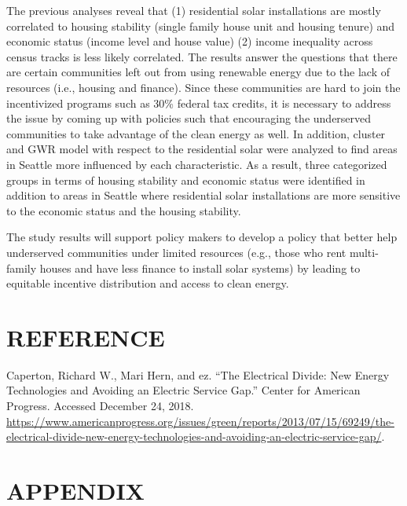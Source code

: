 \documentclass[11pt,]{article}
\begin{document}
The previous analyses reveal that (1) residential solar installations
are mostly correlated to housing stability (single family house unit and
housing tenure) and economic status (income level and house value) (2)
income inequality across census tracks is less likely correlated. The
results answer the questions that there are certain communities left out
from using renewable energy due to the lack of resources (i.e., housing
and finance). Since these communities are hard to join the incentivized
programs such as 30\% federal tax credits, it is necessary to address
the issue by coming up with policies such that encouraging the
underserved communities to take advantage of the clean energy as well.
In addition, cluster and GWR model with respect to the residential solar
were analyzed to find areas in Seattle more influenced by each
characteristic. As a result, three categorized groups in terms of
housing stability and economic status were identified in addition to
areas in Seattle where residential solar installations are more
sensitive to the economic status and the housing stability.

The study results will support policy makers to develop a policy that
better help underserved communities under limited resources (e.g., those
who rent multi-family houses and have less finance to install solar
systems) by leading to equitable incentive distribution and access to
clean energy.

\hypertarget{reference}{%
\section{REFERENCE}\label{reference}}

Caperton, Richard W., Mari Hern, and ez. ``The Electrical Divide: New
Energy Technologies and Avoiding an Electric Service Gap.'' Center for
American Progress. Accessed December 24, 2018.
\url{https://www.americanprogress.org/issues/green/reports/2013/07/15/69249/the-electrical-divide-new-energy-technologies-and-avoiding-an-electric-service-gap/}.

\pagebreak

\hypertarget{appendix}{%
\section{APPENDIX}\label{appendix}}
\end{document}
